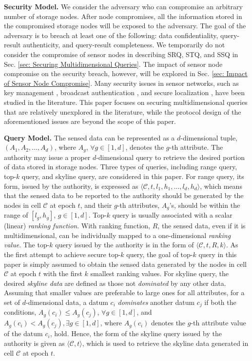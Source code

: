 \documentclass[conference]{IEEEtran}
\begin{document}
\textbf{Security Model.}
We consider the adversary who can compromise an arbitrary number of storage nodes. After node compromises, all the information stored in the compromised storage nodes will be exposed to the adversary. The goal of the adversary is to breach at least one of the following: data confidentiality, query-result authenticity, and query-result completeness. We temporarily do not consider the compromise of sensor nodes in describing SRQ, STQ, and SSQ in Sec. \ref{sec: Securing Multidimensional Queries}. The impact of sensor node compromise on the security breach, however, will be explored in Sec. \ref{sec: Impact of Sensor Node Compromise}. Many security issues in sensor networks, such as key management \cite{cps03,eg02,ylk09}, broadcast authentication \cite{pswct01,ln04}, and secure localization \cite{lnd05,zlfw06}, have been studied in the literature. This paper focuses on securing multidimensional queries that are relatively unexplored in the literature, while the protocol design of the aforementioned issues are beyond the scope of this paper.

\textbf{Query Model.}
The sensed data can be represented as a $d$-dimensional tuple, $(A_1,A_2,\dots, A_d)$, where $A_g$, $\forall g\in[1,d]$, denotes the $g$-th attribute. The authority may issue a proper $d$-dimensional query to retrieve the desired portion of data stored in storage nodes. Three types of queries, including range query, top-$k$ query, and skyline query, are considered in this paper. For range query, its form, issued by the authority, is expressed as $\langle \mathcal{C}, t, l_1, h_1, \dots, l_d, h_d\rangle$, which means that the sensed data to be reported to the authority should be generated by the nodes in cell $\mathcal{C}$ at epoch $t$, and their $g$-th attributes, $A_g$'s, should be within the range of $[l_g,h_g]$, $g\in[1,d]$. Top-$k$ query is usually associated with a scalar (linear) \emph{ranking function}. With ranking function, $R$, the sensed data, even if it is multidimensional, can be individually mapped to a one-dimensional \emph{ranking value}. The top-$k$ query issued by the authority is in the form of $\langle \mathcal{C}, t, R, k\rangle$. As the first attempt to achieve secure top-$k$ query, the goal of top-$k$ query in this paper is simply assumed to obtain the sensed data generated by the nodes in cell $\mathcal{C}$ at epoch $t$ with the first $k$ smallest ranking values. For skyline query, the desired \emph{skyline data} are defined as those not \emph{dominated} by any other data. Assuming that smaller values are preferable to large ones for all attributes, for a set of $d$-dimensional data, a datum $c_i$ \emph{dominates} another datum $c_j$ if both the conditions, $A_g(c_i)\leq A_g(c_j)$, $\forall g\in [1,d]$, and $A_g(c_i)< A_g(c_j), \exists g\in [1,d]$, where $A_g(c_i)$ denotes the $g$-th attribute value of the datum $c_i$, hold. Hence, the form of the skyline query issued by the authority is given as $\langle \mathcal{C}, t\rangle$, which is used to retrieve the skyline data generated in cell $\mathcal{C}$ at epoch $t$.
\end{document}
